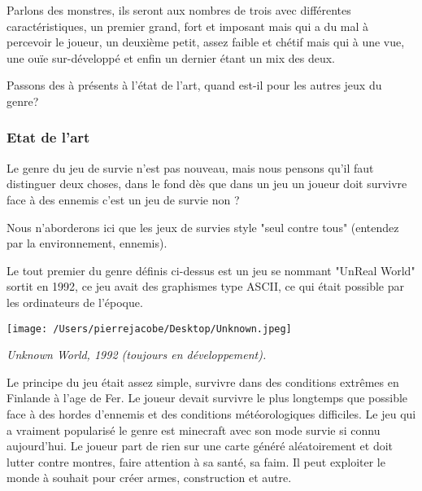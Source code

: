 \documentclass{article}
\begin{document}
\par 
Parlons des monstres, ils seront aux nombres de trois avec différentes caractéristiques, un premier grand, fort et imposant mais qui a du mal à percevoir le joueur, un deuxième petit, assez faible et chétif mais qui à une vue, une ouïe sur-développé et enfin un dernier étant un mix des deux.
\newline


 

\par
Passons des à présents à l'état de l'art, quand est-il pour les autres jeux du genre?
\newline

\subsubsection{Etat de l'art}

\par  
Le genre du jeu de survie n'est pas nouveau, mais nous pensons qu'il faut distinguer deux choses, dans le fond dès que dans un jeu un joueur doit survivre face à des ennemis c'est un jeu de survie non ? 

Nous  n'aborderons ici que les jeux de survies style "seul contre tous" (entendez par la environnement, ennemis).
\newline

\par 
Le tout premier du genre définis ci-dessus est un jeu se nommant "UnReal World" sortit en 1992, ce jeu avait des graphismes type ASCII, ce qui était possible par les ordinateurs de l'époque.
\newline
\vspace*{0.5cm}

\begin{center}
\texttt{[image: /Users/pierrejacobe/Desktop/Unknown.jpeg]}
\end{center}


\begin{center}
	\emph{Unknown World, 1992 (toujours en développement).}
\end{center}

\par 
Le principe du jeu était assez simple, survivre dans des conditions extrêmes en Finlande à l'age de Fer. Le joueur devait survivre le plus longtemps que possible face à des hordes d'ennemis et des conditions météorologiques difficiles. Le jeu qui a vraiment popularisé le genre est minecraft avec son mode survie si connu aujourd'hui. Le joueur part de rien sur une carte généré aléatoirement et doit lutter contre montres, faire attention à sa santé, sa faim. Il peut exploiter le monde à souhait pour créer armes,  construction et autre.
\newline
\end{document}
